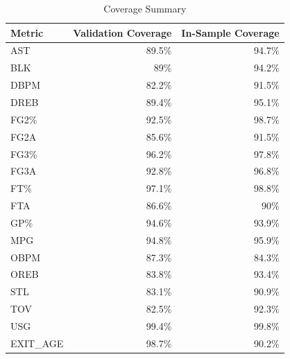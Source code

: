 \begin{table}[t]
\caption*{
{\large Coverage Summary}
} 
\fontsize{12.0pt}{14.4pt}\selectfont
\begin{tabular*}{\linewidth}{@{\extracolsep{\fill}}lrr}
\toprule
Metric & Validation Coverage & In-Sample Coverage \\ 
\midrule\addlinespace[2.5pt]
AST & 89.5\% & 94.7\% \\ 
BLK & 89\% & 94.2\% \\ 
DBPM & 82.2\% & 91.5\% \\ 
DREB & 89.4\% & 95.1\% \\ 
FG2\% & 92.5\% & 98.7\% \\ 
FG2A & 85.6\% & 91.5\% \\ 
FG3\% & 96.2\% & 97.8\% \\ 
FG3A & 92.8\% & 96.8\% \\ 
FT\% & 97.1\% & 98.8\% \\ 
FTA & 86.6\% & 90\% \\ 
GP\% & 94.6\% & 93.9\% \\ 
MPG & 94.8\% & 95.9\% \\ 
OBPM & 87.3\% & 84.3\% \\ 
OREB & 83.8\% & 93.4\% \\ 
STL & 83.1\% & 90.9\% \\ 
TOV & 82.5\% & 92.3\% \\ 
USG & 99.4\% & 99.8\% \\ 
EXIT\_AGE & 98.7\% & 90.2\% \\ 
\bottomrule
\end{tabular*}
\end{table}

